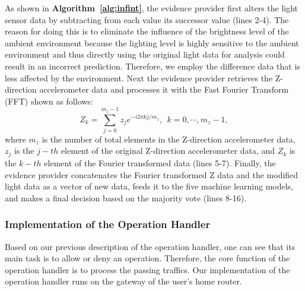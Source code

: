 \documentclass[letterpaper,12pt]{article}
\begin{document}
As shown in {\bf Algorithm~\ref{alg:infint}}, the evidence provider first alters the light sensor data by subtracting from each value its successor value (lines 2-4). The reason for doing this is to eliminate the influence of the brightness level of the ambient environment because the lighting level is highly sensitive to the ambient environment and thus directly using the original light data for analysis could result in an incorrect prediction. Therefore, we employ the difference data that is less affected by the environment. Next the evidence provider retrieves the Z-direction accelerometer data and processes it with the Fast Fourier Transform (FFT) shown as follows:
\begin{equation}
Z_k = \sum_{j=0}^{m_{z}-1}z_{j}e^{-i2\pi kj/m_{z}},\ \ k=0,\cdots,m_{z}-1,
\end{equation}
where $m_{z}$ is the number of total elements in the Z-direction accelerometer data, $z_j$ is the $j-th$ element of the original Z-direction accelerometer data, and $Z_k$ is the $k-th$ element of the Fourier transformed data (lines 5-7). Finally, the evidence provider concatenates the Fourier transformed Z data and the modified light data as a vector of new data, feeds it to the five machine learning models, and makes a final decision based on the majority vote (lines 8-16). 


\subsubsection{Implementation of the Operation Handler}
Based on our previous description of the operation handler, one can see that its main task is to allow or deny an operation. Therefore, the core function of the operation handler is to process the passing traffics. Our implementation of the operation handler runs on the gateway of the user's home router.
\end{document}
